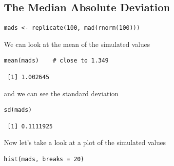 \documentclass[captions=tableheading]{scrbook}
\begin{document}
\subsection{The Median Absolute Deviation}
\label{sec-8-5-2}



\begin{verbatim}
mads <- replicate(100, mad(rnorm(100)))
\end{verbatim}

We can look at the mean of the simulated values


\begin{verbatim}
mean(mads)    # close to 1.349
\end{verbatim}

\begin{verbatim}
 [1] 1.002645
\end{verbatim}

and we can see the standard deviation


\begin{verbatim}
sd(mads)
\end{verbatim}

\begin{verbatim}
 [1] 0.1111925
\end{verbatim}

Now let's take a look at a plot of the simulated values


\begin{verbatim}
hist(mads, breaks = 20)
\end{verbatim}
\end{document}
